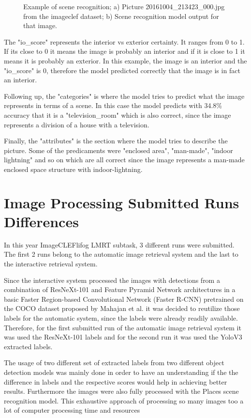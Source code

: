 \begin{figure}[H]
    \caption[Example of scene recognition]{Example of scene recognition; a) Picture 20161004\_213423\_000.jpg from the imageclef dataset; b) Scene recognition model output for that image.}

    \label{fig:imagea}
    \end{figure}


    The "io\_score" represents the interior vs exterior certainty. It ranges from 0 to 1. If its close to 0 it means the image is probably an interior and if it is close to 1 it means it is probably an exterior. In this example, the image is an interior and the "io\_score" is 0, therefore the model predicted correctly that the image is in fact an interior.

    Following up, the "categories" is where the model tries to predict what the image represents in terms of a scene. In this case the model predicts with 34.8\% accuracy that it is a "television\_room" which is also correct, since the image represents a division of a house with a television.

    Finally, the "attributes" is the section where the model tries to describe the picture. Some of the predicaments were "enclosed area", "man-made", "indoor lightning" and so on which are all correct since the image represents a man-made enclosed space structure with indoor-lightning.

\section{Image Processing Submitted Runs Differences}
\label{sec:runs}


    In this year ImageCLEFlifog LMRT subtask, 3 different runs were submitted. The first 2 runs belong to the automatic image retrieval system and the last to the interactive retrieval system. 
    
    Since the interactive system processed the images with detections from a combination of ResNeXt-101 and Feature Pyramid Network architectures in a basic Faster Region-based Convolutional Network (Faster R-CNN) pretrained on the COCO dataset proposed by Mahajan et al. \cite{Mahajan2018} it was decided to reutilize those labels for the automatic system, since the labels were already readily available.  Therefore, for the first submitted run of the automatic image retrieval system it was used the ResNeXt-101 labels and for the second run it was used the YoloV3 \cite{Redmon2018} extracted labels.
    
    The usage of two different set of extracted labels from two different object detection models was mainly done in order to have an understanding if the the difference in labels and the respective scores would help in achieving better results. Furthermore the images were also fully processed with the Places scene recognition model. This exhaustive approach of processing so many images too a  lot of computer processing time and resources


